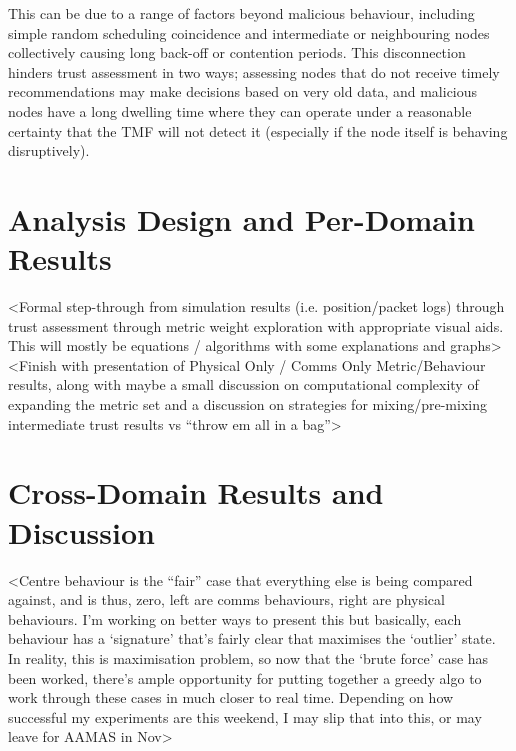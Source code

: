 This can be due to a range of factors beyond malicious behaviour, including simple random scheduling coincidence and intermediate or neighbouring nodes collectively causing long back-off or contention periods.
This disconnection hinders trust assessment in two ways; assessing nodes that do not receive timely recommendations may make decisions based on very old data, and malicious nodes have a long dwelling time where they can operate under a reasonable certainty that the TMF will not detect it (especially if the node itself is behaving disruptively).

\section{Analysis Design and Per-Domain Results}

<Formal step-through from simulation results (i.e. position/packet logs) through trust assessment through metric weight exploration with appropriate visual aids. This will mostly be equations / algorithms with some explanations and graphs>
<Finish with presentation of Physical Only / Comms Only Metric/Behaviour results, along with maybe a small discussion on computational complexity of expanding the metric set and a discussion on strategies for mixing/pre-mixing intermediate trust results vs “throw em all in a bag”>

\section{Cross-Domain Results and Discussion}

<Centre behaviour is the “fair” case that everything else is being compared against, and is thus, zero, left are comms behaviours, right are physical behaviours. I’m working on better ways to present this but basically, each behaviour has a ‘signature’ that’s fairly clear that maximises the ‘outlier’ state. In reality, this is maximisation problem, so now that the ‘brute force’ case has been worked, there’s ample opportunity for putting together a greedy algo to work through these cases in much closer to real time. Depending on how successful my experiments are this weekend, I may slip that into this, or may leave for AAMAS in Nov> 

